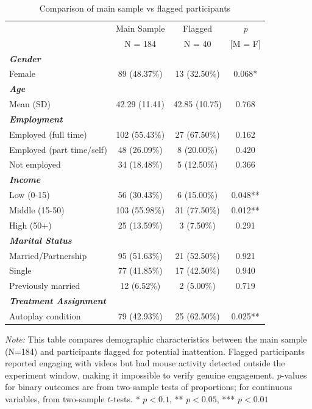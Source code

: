 \documentclass[11pt,a4paper,oneside]{article}
\begin{document}
\begin{table}[H]
 \centering
 \begin{threeparttable}
 \caption{Comparison of main sample vs flagged participants}
 \begin{tabular*}{\textwidth}{@{\extracolsep{\fill}}lcc c@{}}
 \toprule
 & \multicolumn{1}{c}{Main Sample} & \multicolumn{1}{c}{Flagged} & \multicolumn{1}{c}{\textit{p}} \\
 & \multicolumn{1}{c}{N = 184} & \multicolumn{1}{c}{N = 40} & [M = F]\\
 \midrule
 \textit{\textbf{Gender}} & & & \\
 Female & 89 (48.37\%) & 13 (32.50\%) & 0.068* \\ \midrule
 \textit{\textbf{Age}} & & & \\
 Mean (SD) & 42.29 (11.41) & 42.85 (10.75) & 0.768 \\ \midrule
 \textit{\textbf{Employment}} & & & \\
 Employed (full time) & 102 (55.43\%) & 27 (67.50\%) & 0.162 \\
 Employed (part time/self) & 48 (26.09\%) & 8 (20.00\%) & 0.420 \\
 Not employed & 34 (18.48\%) & 5 (12.50\%) & 0.366 \\ \midrule
 \textit{\textbf{Income}} & & & \\
 Low (0-15) & 56 (30.43\%) & 6 (15.00\%) & 0.048** \\
 Middle (15-50) & 103 (55.98\%) & 31 (77.50\%) & 0.012** \\
 High (50+) & 25 (13.59\%) & 3 (7.50\%) & 0.291 \\ \midrule
 \textit{\textbf{Marital Status}} & & & \\ 
 Married/Partnership & 95 (51.63\%) & 21 (52.50\%) & 0.921 \\
 Single & 77 (41.85\%) & 17 (42.50\%) & 0.940 \\
 Previously married & 12 (6.52\%) & 2 (5.00\%) & 0.719 \\ \midrule
 \textit{\textbf{Treatment Assignment}} & & & \\
 Autoplay condition & 79 (42.93\%) & 25 (62.50\%) & 0.025** \\
 \bottomrule
 \end{tabular*}
 \begin{tablenotes}[flushleft]
 \footnotesize
 \item[] \textit{Note:} This table compares demographic characteristics between the main sample (N=184) and participants flagged for potential inattention. Flagged participants reported engaging with videos but had mouse activity detected outside the experiment window, making it impossible to verify genuine engagement. $p$-values for binary outcomes are from two-sample tests of proportions; for continuous variables, from two-sample $t$-tests. * $p < 0.1$, ** $p < 0.05$, *** $p < 0.01$
 \end{tablenotes}
 \label{table_flagged_comparison}
 \end{threeparttable}
\end{table}
\end{document}
